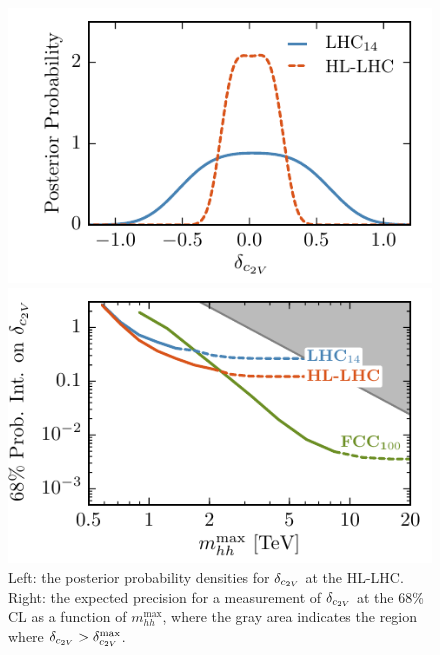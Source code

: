 \begin{figure}[h!]
	\centering
	\begin{minipage}{0.49\textwidth}\centering
		\includegraphics[width=\textwidth]{section3/plots/deltc2v-post-pdf-lhc}
	\end{minipage}
		\begin{minipage}{0.49\textwidth}\centering
		\includegraphics[width=\textwidth]{section3/plots/cl68-mhh-max.pdf}
	\end{minipage}
	\caption{\small Left: the
	  posterior probability densities for $\delta_{c_{2V}}$ at the HL-LHC.
	  Right: the expected
    precision for a measurement of $\delta_{c_{2V}}$ at the 68\% CL
          as a function of $m_{hh}^{\max}$, where
          the gray area indicates the region where $\delta_{c_{2V}} > \delta_{c_{2V}}^\text{max}$.
	}
	\label{fig:post-pdf} 
\end{figure}

